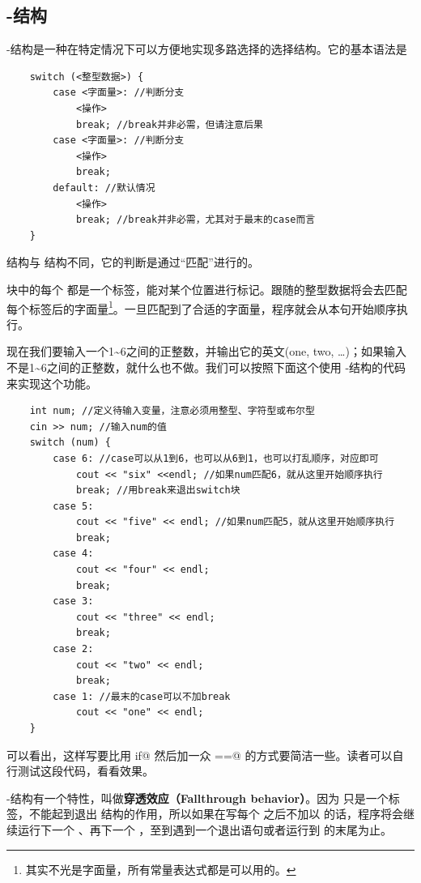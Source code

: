 \subsection*{\lstinline@switch@-\lstinline@case@ 结构}
\lstinline@switch@-\lstinline@case@ 结构是一种在特定情况下可以方便地实现多路选择的选择结构。它的基本语法是
\begin{lstlisting}
    switch (<整型数据>) {
        case <字面量>: //判断分支
            <操作>
            break; //break并非必需，但请注意后果
        case <字面量>: //判断分支
            <操作>
            break;
        default: //默认情况
            <操作>
            break; //break并非必需，尤其对于最末的case而言
    }
\end{lstlisting}\par
\lstinline@switch@\lstinline@case@ 结构与 \lstinline@if@ 结构不同，它的判断是通过``匹配''进行的。\par
\lstinline@switch@ 块中的每个 \lstinline@case@ 都是一个标签，能对某个位置进行标记。\lstinline@switch@ 跟随的整型数据将会去匹配每个\lstinline@case@ 标签后的字面量\footnote{其实不光是字面量，所有常量表达式都是可以用的。}。一旦匹配到了合适的字面量，程序就会从本句开始顺序执行。\par
现在我们要输入一个1\~{}6之间的正整数，并输出它的英文(one, two, \ldots)；如果输入不是1\~{}6之间的正整数，就什么也不做。我们可以按照下面这个使用 \lstinline@switch@-\lstinline@case@ 结构的代码来实现这个功能。
\begin{lstlisting}
    int num; //定义待输入变量，注意必须用整型、字符型或布尔型
    cin >> num; //输入num的值
    switch (num) {
        case 6: //case可以从1到6，也可以从6到1，也可以打乱顺序，对应即可
            cout << "six" <<endl; //如果num匹配6，就从这里开始顺序执行
            break; //用break来退出switch块
        case 5:
            cout << "five" << endl; //如果num匹配5，就从这里开始顺序执行
            break;
        case 4:
            cout << "four" << endl;
            break;
        case 3:
            cout << "three" << endl;
            break;
        case 2:
            cout << "two" << endl;
            break;
        case 1: //最末的case可以不加break
            cout << "one" << endl;
    }
\end{lstlisting}
可以看出，这样写要比用 \lstinline@else if@ 然后加一众 \lstinline@num==@ 的方式要简洁一些。读者可以自行测试这段代码，看看效果。\par
\lstinline@switch@-\lstinline@case@ 结构有一个特性，叫做\textbf{穿透效应（Fallthrough behavior）}。因为 \lstinline@case@ 只是一个标签，不能起到退出 \lstinline@switch@ 结构的作用，所以如果在写每个 \lstinline@case@ 之后不加以 \lstinline@break@ 的话，程序将会继续运行下一个 \lstinline@case@、再下一个 \lstinline@case@，至到遇到一个退出语句或者运行到 \lstinline@switch@ 的末尾为止。\par
